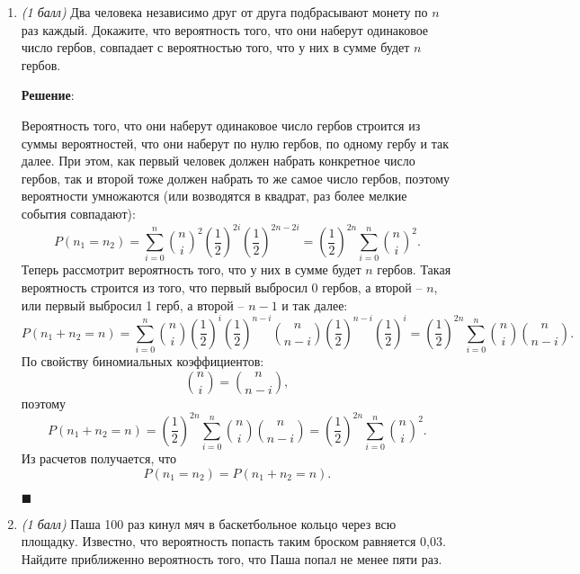 \documentclass{article}
\begin{document}
\begin{enumerate}
    \item \textit{(1 балл)} Два человека независимо друг от друга подбрасывают монету по $n$ раз каждый. Докажите, что вероятность того, что они наберут одинаковое число гербов, совпадает с вероятностью того, что у них в сумме будет $n$ гербов.
    

    \textbf{Решение}:

    Вероятность того, что они наберут одинаковое число гербов строится из суммы вероятностей, что они наберут по нулю гербов, по одному гербу и так далее. При этом, как первый человек должен набрать конкретное число гербов, так и второй тоже должен набрать то же самое число гербов, поэтому вероятности умножаются (или возводятся в квадрат, раз более мелкие события совпадают):
    \begin{equation}
        P(n_1=n_2) = \sum_{i=0}^{n} \binom{n}{i}^2 \left(\frac{1}{2}\right)^{2i} \left(\frac{1}{2}\right)^{2n-2i} = \left(\frac{1}{2}\right)^{2n} \sum_{i=0}^{n} \binom{n}{i}^2.
    \end{equation} 
    Теперь рассмотрит вероятность того, что у них в сумме будет $n$ гербов. Такая вероятность строится из того, что первый выбросил 0 гербов, а второй -- $n$, или первый выбросил 1 герб, а второй -- $n-1$ и так далее:
    \begin{equation}
        P(n_1+n_2=n) = \sum_{i=0}^{n} \binom{n}{i} \left(\frac{1}{2}\right)^{i} \left(\frac{1}{2}\right)^{n-i} \binom{n}{n-i} \left(\frac{1}{2}\right)^{n-i} \left(\frac{1}{2}\right)^{i} = \left(\frac{1}{2}\right)^{2n} \sum_{i=0}^{n} \binom{n}{i} \binom{n}{n-i}.
    \end{equation}
    По свойству биномиальных коэффициентов:
    \begin{equation}
        \binom{n}{i} = \binom{n}{n-i},
    \end{equation}
    поэтому 
    \begin{equation}
        P(n_1+n_2=n) = \left(\frac{1}{2}\right)^{2n} \sum_{i=0}^{n} \binom{n}{i} \binom{n}{n-i} = \left(\frac{1}{2}\right)^{2n} \sum_{i=0}^{n} \binom{n}{i}^2.
    \end{equation}
    Из расчетов получается, что
    \begin{equation}
        P(n_1=n_2) = P(n_1+n_2=n).
    \end{equation}

    \begin{flushright}
        $\blacksquare$
    \end{flushright}
    
    \item \textit{(1 балл)} Паша 100 раз кинул мяч в баскетбольное кольцо через всю площадку. Известно, что вероятность попасть таким броском равняется 0,03. Найдите приближенно вероятность того, что Паша попал не менее пяти раз.
    


\end{enumerate}
\end{document}
